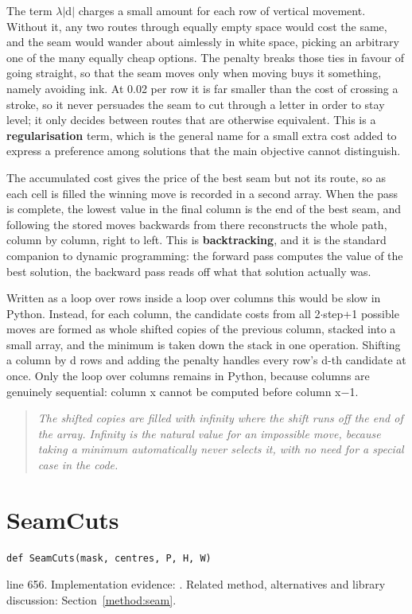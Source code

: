 The term $\lambda$$|$d$|$ charges a small amount for each row of vertical movement. Without it, any two routes through equally empty space would cost the same, and the seam would wander about aimlessly in white space, picking an arbitrary one of the many equally cheap options. The penalty breaks those ties in favour of going straight, so that the seam moves only when moving buys it something, namely avoiding ink. At 0.02 per row it is far smaller than the cost of crossing a stroke, so it never persuades the seam to cut through a letter in order to stay level; it only decides between routes that are otherwise equivalent. This is a \textbf{regularisation} term, which is the general name for a small extra cost added to express a preference among solutions that the main objective cannot distinguish.


The accumulated cost gives the price of the best seam but not its route, so as each cell is filled the winning move is recorded in a second array. When the pass is complete, the lowest value in the final column is the end of the best seam, and following the stored moves backwards from there reconstructs the whole path, column by column, right to left. This is \textbf{backtracking}, and it is the standard companion to dynamic programming: the forward pass computes the value of the best solution, the backward pass reads off what that solution actually was.


Written as a loop over rows inside a loop over columns this would be slow in Python. Instead, for each column, the candidate costs from all 2$\cdot$step+1 possible moves are formed as whole shifted copies of the previous column, stacked into a small array, and the minimum is taken down the stack in one operation. Shifting a column by d rows and adding the penalty handles every row's d-th candidate at once. Only the loop over columns remains in Python, because columns are genuinely sequential: column x cannot be computed before column x$-$1.


\begin{quote}\small\itshape The shifted copies are filled with infinity where the shift runs off the end of the array. Infinity is the natural value for an impossible move, because taking a minimum automatically never selects it, with no need for a special case in the code.\end{quote}


\section{SeamCuts}\label{fn:segment:SeamCuts}
\begin{lstlisting}[style=sig]
def SeamCuts(mask, centres, P, H, W)
\end{lstlisting}
 line 656. Implementation evidence: \cite{code2026}. Related method, alternatives and library discussion: Section~\ref{method:seam}.


